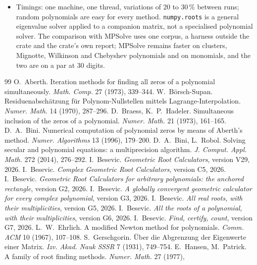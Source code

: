 \documentclass[10pt,a4paper]{article}
\theoremstyle{definition}
\numberwithin{equation}{section}
\begin{document}
\begin{itemize}
 it saves at most one. The big integers are those of \texttt{num-bigint} (below a thousand bits their
 time is mostly allocation), and nothing runs in parallel.
\item Timings: one machine, one thread, variations of 20 to 30\,\% between runs; random
 polynomials are easy for every method. \texttt{numpy.roots} is a general eigenvalue solver applied to
 a companion matrix, not a specialised polynomial solver. The comparison with MPSolve uses one corpus,
 a harness outside the crate and the crate's own report; MPSolve remains faster on clusters, Mignotte,
 Wilkinson and Chebyshev polynomials and on monomials, and the two are on a par at 30 digits.
\end{itemize}

\begin{thebibliography}{99}\small
{} O.~Aberth. Iteration methods for finding all zeros of a polynomial simultaneously.
 \emph{Math. Comp.} 27 (1973), 339--344.
 W.~B\"orsch-Supan. Residuenabsch\"atzung f\"ur Polynom-Nullstellen mittels
 Lagrange-Interpolation. \emph{Numer. Math.} 14 (1970), 287--296.
 D.~Braess, K.~P.~Hadeler. Simultaneous inclusion of the zeros of a polynomial.
 \emph{Numer. Math.} 21 (1973), 161--165.
 D.~A.~Bini. Numerical computation of polynomial zeros by means of Aberth's method.
 \emph{Numer. Algorithms} 13 (1996), 179--200.
 D.~A.~Bini, L.~Robol. Solving secular and polynomial equations: a multiprecision
 algorithm. \emph{J. Comput. Appl. Math.} 272 (2014), 276--292.
 I.~Besevic. \emph{Geometric Root Calculators}, version V29, 2026.
 I.~Besevic. \emph{Complex Geometric Root Calculators}, version C5, 2026.
 I.~Besevic. \emph{Geometric Root Calculators for arbitrary polynomials: the anchored
 rectangle}, version G2, 2026.
 I.~Besevic. \emph{A globally convergent geometric calculator for every complex
 polynomial}, version G3, 2026.
 I.~Besevic. \emph{All real roots, with their multiplicities}, version G5, 2026.
 I.~Besevic. \emph{All the roots of a polynomial, with their multiplicities}, version G6,
 2026.
 I.~Besevic. \emph{Find, certify, count}, version G7, 2026.
 L.~W.~Ehrlich. A modified Newton method for polynomials. \emph{Comm. ACM} 10 (1967),
 107--108.
 S.~Gerschgorin. \"Uber die Abgrenzung der Eigenwerte einer Matrix. \emph{Izv. Akad.
 Nauk SSSR} 7 (1931), 749--754.
 E.~Hansen, M.~Patrick. A family of root finding methods. \emph{Numer. Math.} 27 (1977),

\end{thebibliography}
\end{document}
